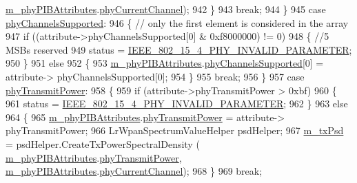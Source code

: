 \begin{DoxyCode}
      \hyperlink{classns3_1_1LrWpanPhy_a7f263bedbdeed627f7c5f2dab8e960c8}{m\_phyPIBAttributes}.\hyperlink{structns3_1_1LrWpanPhyPibAttributes_a8e620dfd0f5b45fa6c9525d93c498fcb}{phyCurrentChannel});
942           \}
943         \textcolor{keywordflow}{break};
944       \}
945     \textcolor{keywordflow}{case} \hyperlink{group__lr-wpan_ggae6da9958c1a7194ce9160d866d4164bca7182eddd32a71c10e2a22d37fc8af73c}{phyChannelsSupported}:
946       \{   \textcolor{comment}{// only the first element is considered in the array}
947         \textcolor{keywordflow}{if} ((attribute->phyChannelsSupported[0] & 0xf8000000) != 0)
948           \{    \textcolor{comment}{//5 MSBs reserved}
949             status = \hyperlink{group__lr-wpan_gga6494269d13d45c511a07b7ccbb1de754ac611b9c3a3136400c3d47c6bee4e452d}{IEEE\_802\_15\_4\_PHY\_INVALID\_PARAMETER};
950           \}
951         \textcolor{keywordflow}{else}
952           \{
953             \hyperlink{classns3_1_1LrWpanPhy_a7f263bedbdeed627f7c5f2dab8e960c8}{m\_phyPIBAttributes}.\hyperlink{structns3_1_1LrWpanPhyPibAttributes_a1bdcf71ffdbe0812d44d95ae2a5ae633}{phyChannelsSupported}[0] = attribute->
      phyChannelsSupported[0];
954           \}
955         \textcolor{keywordflow}{break};
956       \}
957     \textcolor{keywordflow}{case} \hyperlink{group__lr-wpan_ggae6da9958c1a7194ce9160d866d4164bcafb80a10424df7a29c6ba2c8e8c551f20}{phyTransmitPower}:
958       \{
959         \textcolor{keywordflow}{if} (attribute->phyTransmitPower > 0xbf)
960           \{
961             status = \hyperlink{group__lr-wpan_gga6494269d13d45c511a07b7ccbb1de754ac611b9c3a3136400c3d47c6bee4e452d}{IEEE\_802\_15\_4\_PHY\_INVALID\_PARAMETER};
962           \}
963         \textcolor{keywordflow}{else}
964           \{
965             \hyperlink{classns3_1_1LrWpanPhy_a7f263bedbdeed627f7c5f2dab8e960c8}{m\_phyPIBAttributes}.\hyperlink{structns3_1_1LrWpanPhyPibAttributes_a3fa4a8802211d54c7b4065fe3f086640}{phyTransmitPower} = attribute->
      phyTransmitPower;
966             LrWpanSpectrumValueHelper psdHelper;
967             \hyperlink{classns3_1_1LrWpanPhy_a136f3eddb97dc50b4689df6a36df1f76}{m\_txPsd} = psdHelper.CreateTxPowerSpectralDensity (
      \hyperlink{classns3_1_1LrWpanPhy_a7f263bedbdeed627f7c5f2dab8e960c8}{m\_phyPIBAttributes}.\hyperlink{structns3_1_1LrWpanPhyPibAttributes_a3fa4a8802211d54c7b4065fe3f086640}{phyTransmitPower}, 
      \hyperlink{classns3_1_1LrWpanPhy_a7f263bedbdeed627f7c5f2dab8e960c8}{m\_phyPIBAttributes}.\hyperlink{structns3_1_1LrWpanPhyPibAttributes_a8e620dfd0f5b45fa6c9525d93c498fcb}{phyCurrentChannel});
968           \}
969         \textcolor{keywordflow}{break};

\end{DoxyCode}
